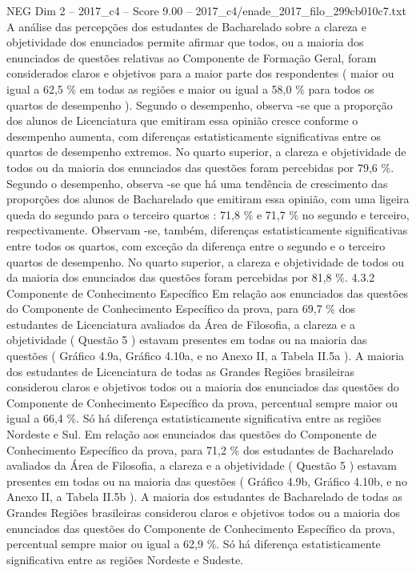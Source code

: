 \begin{textsample}{NEG Dim 2 – 2017\_c4 – Score 9.00 – 2017\_c4/enade\_2017\_filo\_299cb010c7.txt}
A análise das percepções dos estudantes de Bacharelado sobre a clareza e objetividade dos enunciados permite afirmar que todos, ou a maioria dos enunciados de questões relativas ao Componente de Formação Geral, foram considerados claros e objetivos para a maior parte dos respondentes ( maior ou igual a 62,5 \% em todas as regiões e maior ou igual a 58,0 \% para todos os quartos de desempenho ).
Segundo o desempenho, observa -se que a proporção dos alunos de Licenciatura que emitiram essa opinião cresce conforme o desempenho aumenta, com diferenças estatisticamente significativas entre os quartos de desempenho extremos.
No quarto superior, a clareza e objetividade de todos ou da maioria dos enunciados das questões foram percebidas por 79,6 \%.
Segundo o desempenho, observa -se que há uma tendência de crescimento das proporções dos alunos de Bacharelado que emitiram essa opinião, com uma ligeira queda do segundo para o terceiro quartos : 71,8 \% e 71,7 \% no segundo e terceiro, respectivamente.
Observam -se, também, diferenças estatisticamente significativas entre todos os quartos, com exceção da diferença entre o segundo e o terceiro quartos de desempenho.
No quarto superior, a clareza e objetividade de todos ou da maioria dos enunciados das questões foram percebidas por 81,8 \%. 4.3.2 Componente de Conhecimento Específico Em relação aos enunciados das questões do Componente de Conhecimento Específico da prova, para 69,7 \% dos estudantes de Licenciatura avaliados da Área de Filosofia, a clareza e a objetividade ( Questão 5 ) estavam presentes em todas ou na maioria das questões ( Gráfico 4.9a, Gráfico 4.10a, e no Anexo II, a Tabela II.5a ).
A maioria dos estudantes de Licenciatura de todas as Grandes Regiões brasileiras considerou claros e objetivos todos ou a maioria dos enunciados das questões do Componente de Conhecimento Específico da prova, percentual sempre maior ou igual a 66,4 \%.
Só há diferença estatisticamente significativa entre as regiões Nordeste e Sul.
Em relação aos enunciados das questões do Componente de Conhecimento Específico da prova, para 71,2 \% dos estudantes de Bacharelado avaliados da Área de Filosofia, a clareza e a objetividade ( Questão 5 ) estavam presentes em todas ou na maioria das questões ( Gráfico 4.9b, Gráfico 4.10b, e no Anexo II, a Tabela II.5b ).
A maioria dos estudantes de Bacharelado de todas as Grandes Regiões brasileiras considerou claros e objetivos todos ou a maioria dos enunciados das questões do Componente de Conhecimento Específico da prova, percentual sempre maior ou igual a 62,9 \%.
Só há diferença estatisticamente significativa entre as regiões Nordeste e Sudeste.

\end{textsample}

